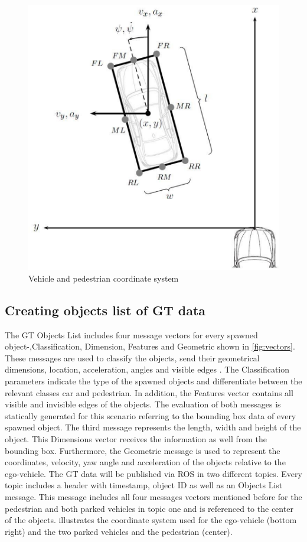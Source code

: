 \begin{figure}[b]
	\centering
	\includegraphics[scale=0.4]{images/KoordinatenSystem}
	\caption{Vehicle and pedestrian coordinate system \cite{Aeberhard}}
	\label{fig:coordinate}
\end{figure}
\subsection{Creating objects list of \ac{GT} data}\label{B}
The \ac{GT} Objects List includes four message vectors for every spawned object-,Classification, Dimension, Features and Geometric shown in \cref{fig:vectors}. These messages are used to classify the objects, send their geometrical dimensions, location, acceleration, angles and visible edges \cite{Aeberhard}.
The Classification parameters indicate the type of the spawned objects and differentiate between the relevant classes car and pedestrian. In addition, the Features vector contains all visible and invisible edges of the objects. The evaluation of both messages is statically generated for this scenario referring to the bounding box data of every spawned object. The third message represents the length, width and height of the object. This Dimensions vector receives the information as well from the bounding box. Furthermore, the Geometric message is used to represent the coordinates, velocity, yaw angle and acceleration of the objects relative to the ego-vehicle. 
The \ac{GT} data will be published via \ac{ROS} in two different topics. Every topic includes a header with timestamp, object \ac{ID} as well as an Objects List message. This message includes all four messages vectors mentioned before for the pedestrian and both parked vehicles in topic one and is referenced to the center of the objects.  illustrates the coordinate system used for the ego-vehicle (bottom right) and the two parked vehicles and the pedestrian (center). 

